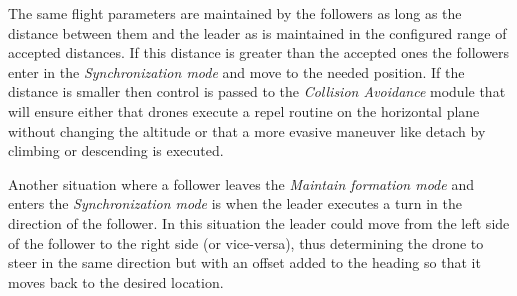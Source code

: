 The same flight parameters are maintained by the followers as long
as the distance between them and the leader as is maintained in the configured
range of accepted distances. If this distance is greater than the accepted ones
the followers enter in the \textit{Synchronization mode} and move to the 
needed position. If the distance is smaller then control is passed to the
\textit{Collision Avoidance} module that will ensure either that drones
execute a repel routine on the horizontal plane without changing the altitude
or that a more evasive maneuver like detach by climbing or descending is executed.

Another situation where a follower leaves the \textit{Maintain formation mode} 
and enters the \textit{Synchronization mode} is when the leader executes
a turn in the direction of the follower. In this situation the leader could 
move from the left side of the follower to the right side (or vice-versa), thus
determining the drone to steer in the same direction but with an offset added
to the heading so that it moves back to the desired location.

